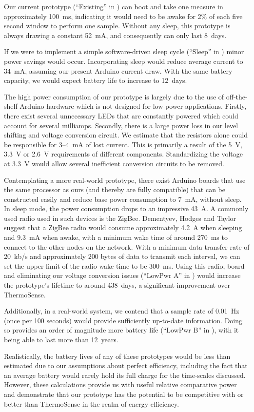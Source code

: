 \documentclass[../thesis/thesis.tex]{subfiles}
\begin{document}
Our current prototype (``Existing'' in ) can boot and take one measure in approximately 100~ms, indicating it would need to be awake for 2\% of each five second window to perform one sample. Without any sleep, this prototype is always drawing a constant 52~mA, and consequently can only last 8~days.

If we were to implement a simple software-driven sleep cycle (``Sleep'' in ) minor power savings would occur. Incorporating sleep would reduce average current to 34~mA, assuming our present Arduino current draw. With the same battery capacity, we would expect battery life to increase to 12~days.

The high power consumption of our prototype is largely due to the use of off-the-shelf Arduino hardware which is not designed for low-power applications. Firstly, there exist several unnecessary LEDs that are constantly powered which could account for several milliamps. Secondly, there is a large power loss in our level shifting and voltage conversion circuit. We estimate that the resistors alone could be responsible for 3--4~mA of lost current. This is primarily a result of the 5~V, 3.3~V or 2.6~V requirements of different components. Standardizing the voltage at 3.3~V would allow several inefficient conversion circuits to be removed.

Contemplating a more real-world prototype, there exist Arduino boards that use the same processor as ours (and thereby are fully compatible) that can be constructed easily and reduce base power consumption to 7~mA, without sleep. In sleep mode, the power consumption drops to an impressive 43~\textmu A. A commonly used radio used in such devices is the ZigBee. Dementyev, Hodges and Taylor~\etal~\cite{dementyev2013power} suggest that a ZigBee radio would consume approximately 4.2~\textmu A when sleeping and 9.3~mA when awake, with a minimum wake time of around 270~ms to connect to the other nodes on the network. With a minimum data transfer rate of 20~kb/s and approximately 200 bytes of data to transmit each interval, we can set the upper limit of the radio wake time to be 300~ms. Using this radio, board and eliminating our voltage conversion issues (``LowPwr A'' in ) would increase the prototype's lifetime to around 438~days, a significant improvement over ThermoSense.

Additionally, in a real-world system, we contend that a sample rate of 0.01~Hz (once per 100 seconds) would provide sufficiently up-to-date information. Doing so provides an order of magnitude more battery life (``LowPwr B'' in ), with it being able to last more than 12~years.

Realistically, the battery lives of any of these prototypes would be less than estimated due to our assumptions about perfect efficiency, including the fact that an average battery would rarely hold its full charge for the time-scales discussed. However, these calculations provide us with useful relative comparative power and demonstrate that our prototype has the potential to be competitive with or better than ThermoSense in the realm of energy efficiency.

\end{document}
